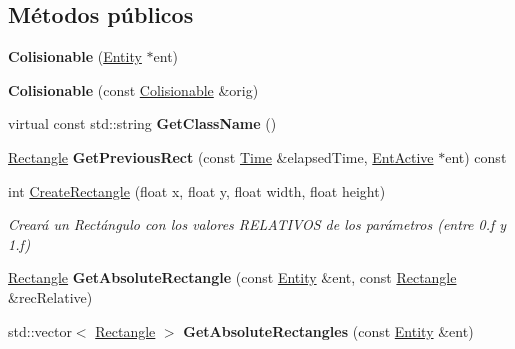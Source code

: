 \subsection*{Métodos públicos}
\begin{DoxyCompactItemize}
\item 
\hypertarget{classColisionable_a851878fb3a93420ca0cbec4605dbe2e1}{{\bfseries Colisionable} (\hyperlink{classEntity}{Entity} $\ast$ent)}\label{classColisionable_a851878fb3a93420ca0cbec4605dbe2e1}

\item 
\hypertarget{classColisionable_ac170a1b17950bb9f72b01261e474d65f}{{\bfseries Colisionable} (const \hyperlink{classColisionable}{Colisionable} \&orig)}\label{classColisionable_ac170a1b17950bb9f72b01261e474d65f}

\item 
\hypertarget{classColisionable_aecb15e3d0280c07f16fb12ee7c399b43}{virtual const std\-::string {\bfseries Get\-Class\-Name} ()}\label{classColisionable_aecb15e3d0280c07f16fb12ee7c399b43}

\item 
\hypertarget{classColisionable_a49c839ada10fd0b51ae3b04da9fc5831}{\hyperlink{classRectangle}{Rectangle} {\bfseries Get\-Previous\-Rect} (const \hyperlink{classTime}{Time} \&elapsed\-Time, \hyperlink{classEntActive}{Ent\-Active} $\ast$ent) const }\label{classColisionable_a49c839ada10fd0b51ae3b04da9fc5831}

\item 
\hypertarget{classColisionable_a8753bbdd0249f54cdd2b20177d40e55e}{int \hyperlink{classColisionable_a8753bbdd0249f54cdd2b20177d40e55e}{Create\-Rectangle} (float x, float y, float width, float height)}\label{classColisionable_a8753bbdd0249f54cdd2b20177d40e55e}

\begin{DoxyCompactList}\small\item\em Creará un Rectángulo con los valores R\-E\-L\-A\-T\-I\-V\-O\-S de los parámetros (entre 0.\-f y 1.\-f) \end{DoxyCompactList}\item 
\hypertarget{classColisionable_a2fd73529e7ac9eb9977c32dbed5825e9}{\hyperlink{classRectangle}{Rectangle} {\bfseries Get\-Absolute\-Rectangle} (const \hyperlink{classEntity}{Entity} \&ent, const \hyperlink{classRectangle}{Rectangle} \&rec\-Relative)}\label{classColisionable_a2fd73529e7ac9eb9977c32dbed5825e9}

\item 
\hypertarget{classColisionable_a7341c612181dcaedaa140f47bc4ddea4}{std\-::vector$<$ \hyperlink{classRectangle}{Rectangle} $>$ {\bfseries Get\-Absolute\-Rectangles} (const \hyperlink{classEntity}{Entity} \&ent)}\label{classColisionable_a7341c612181dcaedaa140f47bc4ddea4}


\end{DoxyCompactItemize}
